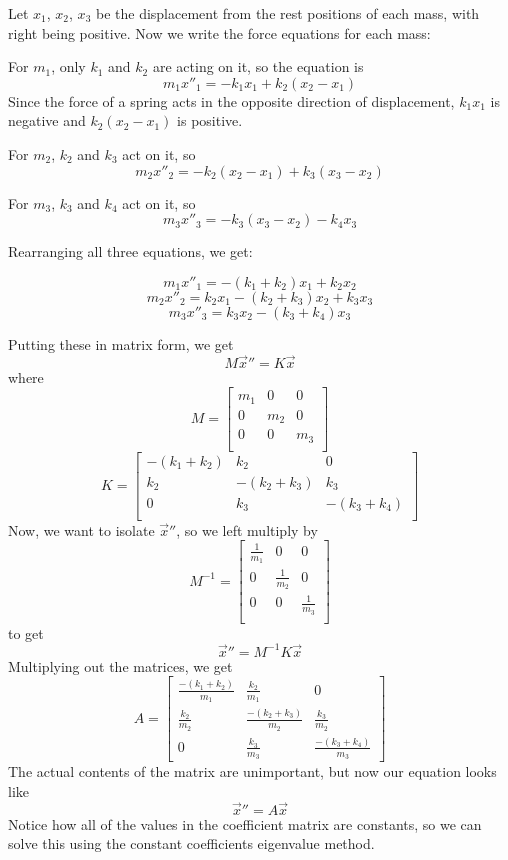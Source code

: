 \documentclass{article}
\begin{document}
\begin{solution}
Let $x_1$, $x_2$, $x_3$ be the displacement from the rest positions of each mass, with right being positive. Now we write the force equations for each mass:

For $m_1$, only $k_1$ and $k_2$ are acting on it, so the equation is $$m_1 x''_1 = -k_1x_1 + k_2(x_2-x_1)$$Since the force of a spring acts in the opposite direction of displacement, $k_1x_1$ is negative and $k_2(x_2-x_1)$ is positive. 

For $m_2$, $k_2$ and $k_3$ act on it, so $$m_2 x''_2 = -k_2(x_2-x_1) + k_3(x_3-x_2)$$

For $m_3$, $k_3$ and $k_4$ act on it, so $$m_3x''_3 = -k_3(x_3-x_2) - k_4x_3$$

Rearranging all three equations, we get:

$$m_1x''_1 = -(k_1+k_2)x_1 + k_2x_2$$$$m_2x''_2 = k_2x_1 -(k_2 + k_3)x_2 + k_3x_3$$$$m_3x''_3 = k_3x_2 - (k_3 + k_4)x_3$$

Putting these in matrix form, we get $$M\vec{x}'' = K\vec{x}$$where $$M = \begin{bmatrix}
    m_1 & 0 & 0\\
    0 & m_2 & 0\\
    0 & 0 & m_3\\
\end{bmatrix}$$$$K = \begin{bmatrix}
    -(k_1+k_2) & k_2 & 0\\
    k_2 & -(k_2+k_3) & k_3\\
    0 & k_3 & -(k_3+k_4)\\
\end{bmatrix}$$Now, we want to isolate $\vec{x}''$, so we left multiply by $$M ^{-1} = \begin{bmatrix}
    \frac{1}{m_1} & 0 & 0\\
    0 & \frac{1}{m_2} & 0\\
    0 & 0 & \frac{1}{m_3}\\
\end{bmatrix}$$ to get $$\vec{x}'' = M ^{-1} K \vec{x}$$Multiplying out the matrices, we get $$A = \begin{bmatrix}
    \frac{-(k_1+k_2)}{m_1} & \frac{k_2}{m_1} & 0\\
    \frac{k_2}{m_2} & \frac{-(k_2 + k_3)}{m_2} & \frac{k_3}{m_2}\\
    0 & \frac{k_3}{m_3} & \frac{-(k_3+k_4)}{m_3}
\end{bmatrix}$$The actual contents of the matrix are unimportant, but now our equation looks like $$\vec{x}'' = A\vec{x}$$Notice how all of the values in the coefficient matrix are constants, so we can solve this using the constant coefficients eigenvalue method.


\end{solution}
\end{document}
